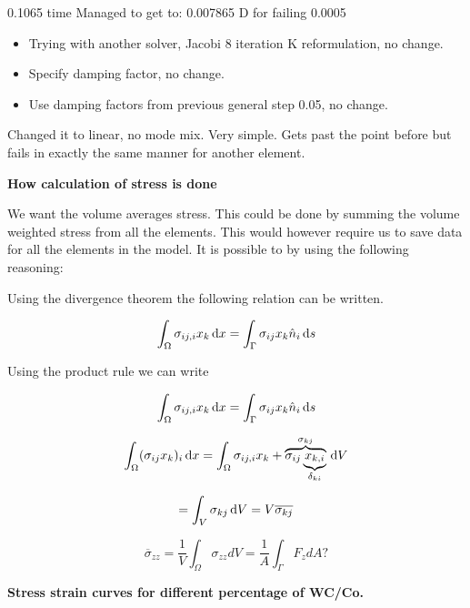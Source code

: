 \documentclass[convergence.tex]{subfiles}
\begin{document}
0.1065 time
Managed to get to: 0.007865 D for failing 0.0005

\begin{itemize}
\item Trying with another solver, Jacobi 8 iteration K reformulation, no change.
\item Specify damping factor, no change.
\item Use damping factors from previous general step 0.05, no change.
\end{itemize}

 
 
 Changed it to linear, no mode mix. Very simple. Gets past the point before but fails in exactly the same manner for another element.
 
 
\newpage
\textbf{How calculation of stress is done}

We want the volume averages stress. This could be done by summing the volume weighted stress from all the elements. This would however require us to save data for all the elements in the model. It is possible to by using the following reasoning:

Using the divergence theorem the following relation can be written.

\begin{equation}
\int_\Omega \sigma_{ij,i} x_k \, \mathrm{d} x = \int_\Gamma \sigma_{ij}  x_k \hat{n}_i \, \mathrm{d} s
\end{equation}

Using the product rule we can write

\begin{equation}
\int_\Omega \sigma_{ij,i} x_k \, \mathrm{d} x = \int_\Gamma \sigma_{ij}  x_k \hat{n}_i \, \mathrm{d} s
\end{equation}



\begin{equation}
\int_\Omega ( \sigma_{ij} x_k )_i \, \mathrm{d} x = \int_\Omega \sigma_{ij,i} x_k + \overbrace{\sigma_{ij} \underbrace{x_{k,i}}_{\delta_{ki}}}^{\sigma_{kj}} \, \mathrm{d} V 
\end{equation}

\begin{equation}
= \int_V \sigma_{kj} \, \mathrm{d} V = V \overline{\sigma_{kj}}
\end{equation}


\[ \overline{\sigma}_{zz} = \frac{1}{V} \int_\Omega \sigma_{zz} dV = \frac{1}{A} \int_\Gamma F_{z} dA? \]

\textbf{Stress strain curves for different percentage of WC/Co.}
\end{document}

